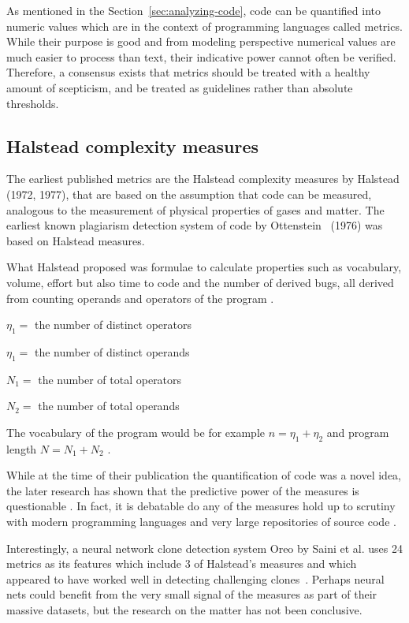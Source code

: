 As mentioned in the Section~\ref{sec:analyzing-code}, code can be quantified into numeric values which are in the context of programming languages called metrics. While their purpose is good and from modeling perspective numerical values are much easier to process than text, their indicative power cannot often be verified. Therefore, a consensus exists that metrics should be treated with a healthy amount of scepticism, and be treated as guidelines rather than absolute thresholds.

\subsection{Halstead complexity measures}

The earliest published metrics are the Halstead complexity measures by Halstead (1972, 1977), \cite{halstead-1972, halstead-1977} that are based on the assumption that code can be measured, analogous to the measurement of physical properties of gases and matter. The earliest known plagiarism detection system of code by Ottenstein~\cite{ottenstein, jplag} (1976) was based on Halstead measures.

What Halstead proposed was formulae to calculate properties such as vocabulary, volume, effort but also time to code and the number of derived bugs, all derived from counting operands and operators of the program \cite{halstead-1977}.

\begin{center}
$\eta_{1}=$ the number of distinct operators

$\eta_{1} =$ the number of distinct operands

$N_{1} =$ the number of total operators

$N_{2} =$ the number of total operands
\end{center}

The vocabulary of the program would be for example $n=\eta_{1} + \eta_{2}$ and program length $N=N_{1} + N_{2}$ \cite{halstead-1977}.

While at the time of their publication the quantification of code was a novel idea, the later research has shown that the predictive power of the measures is questionable \cite{halstead-in-oop-2004, halstead-emperors-clothes-1982}. In fact, it is debatable do any of the measures hold up to scrutiny with modern programming languages and very large repositories of source code \cite{halstead-in-oop-2004}.

Interestingly, a neural network clone detection system Oreo by Saini et al. uses 24 metrics as its features which include 3 of Halstead's measures and which appeared to have worked well in detecting challenging clones~\cite{oreo, chaiyong-2018}. Perhaps neural nets could benefit from the very small signal of the measures as part of their massive datasets, but the research on the matter has not been conclusive.

